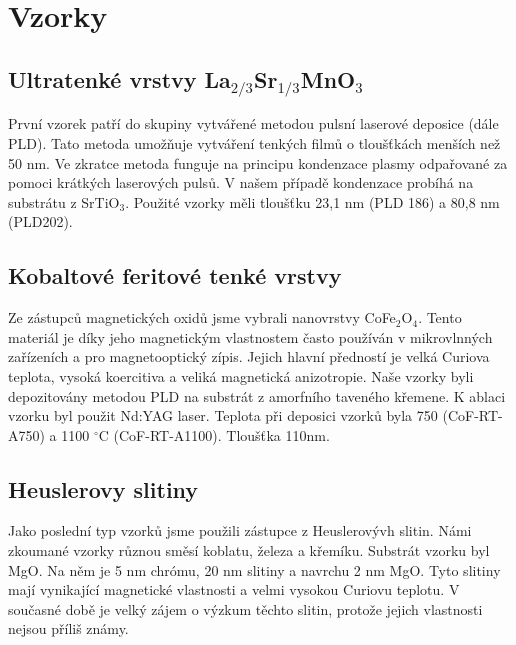 \chapter{Vzorky}

\section{Ultratenké vrstvy La$_{2/3}$Sr$_{1/3}$MnO$_3$}
První vzorek patří do skupiny vytvářené metodou pulsní laserové deposice (dále PLD). Tato metoda umožňuje vytváření tenkých filmů o tloušťkách menších než 50 nm. Ve zkratce metoda funguje na principu kondenzace plasmy odpařované za pomoci krátkých laserových pulsů. V našem případě kondenzace probíhá na substrátu z SrTiO$_3$. Použité vzorky měli tloušťku 23,1 nm (PLD 186) a 80,8 nm (PLD202). 

\section{Kobaltové feritové tenké vrstvy}
Ze zástupců magnetických oxidů jsme vybrali nanovrstvy CoFe$_2$O$_4$. Tento materiál je díky jeho magnetickým vlastnostem často používán v mikrovlnných zařízeních a  pro magnetooptický zípis. Jejich hlavní předností je velká Curiova teplota, vysoká koercitiva a veliká magnetická anizotropie. Naše vzorky byli depozitovány metodou PLD na substrát z amorfního taveného křemene. K ablaci vzorku byl použit Nd:YAG laser. Teplota při deposici vzorků byla 750 (CoF-RT-A750) a 1100 $^\circ$C (CoF-RT-A1100). Tloušťka 110nm.

\section{Heuslerovy slitiny}
Jako poslední typ vzorků jsme použili zástupce z Heuslerovývh slitin. Námi zkoumané vzorky různou směsí koblatu, železa a křemíku. Substrát vzorku byl MgO. Na něm je 5 nm chrómu, 20 nm slitiny a navrchu 2 nm MgO. Tyto slitiny mají vynikající magnetické vlastnosti a velmi vysokou Curiovu teplotu. V současné době je velký zájem o výzkum těchto slitin, protože jejich vlastnosti nejsou příliš známy.  
